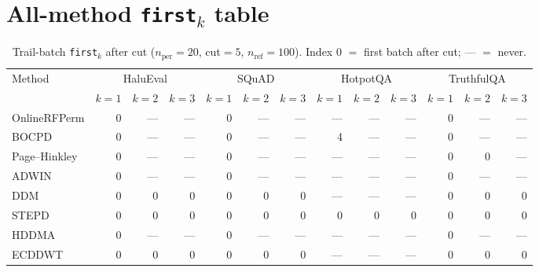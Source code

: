 \documentclass[11pt]{article}
\begin{document}
\section{All-method \texttt{first}$_k$ table}
\begin{table}[h]
\centering
\small
\caption{Trail-batch \texttt{first}$_k$ after cut
($n_{\mathrm{per}}=20$, cut$=5$, $n_{\mathrm{ref}}=100$).
Index $0$ $=$ first batch after cut; --- $=$ never.}
\begin{tabular}{lrrrrrrrrrrrr}
\toprule
Method & \multicolumn{3}{c}{HaluEval} & \multicolumn{3}{c}{SQuAD}
 & \multicolumn{3}{c}{HotpotQA} & \multicolumn{3}{c}{TruthfulQA} \\
\cmidrule(lr){2-4} \cmidrule(lr){5-7} \cmidrule(lr){8-10} \cmidrule(lr){11-13}
 & $k{=}1$ & $k{=}2$ & $k{=}3$ & $k{=}1$ & $k{=}2$ & $k{=}3$
 & $k{=}1$ & $k{=}2$ & $k{=}3$ & $k{=}1$ & $k{=}2$ & $k{=}3$ \\
\midrule
OnlineRFPerm & 0 & --- & --- & 0 & --- & --- & --- & --- & --- & 0 & --- & --- \\
BOCPD        & 0 & --- & --- & 0 & --- & --- & 4   & --- & --- & 0 & --- & --- \\
Page--Hinkley& 0 & --- & --- & 0 & --- & --- & --- & --- & --- & 0 & 0   & --- \\
ADWIN        & 0 & --- & --- & 0 & --- & --- & --- & --- & --- & 0 & --- & --- \\
DDM          & 0 & 0   & 0   & 0 & 0   & 0   & --- & --- & --- & 0 & 0   & 0   \\
STEPD        & 0 & 0   & 0   & 0 & 0   & 0   & 0   & 0   & 0   & 0 & 0   & 0   \\
HDDMA        & 0 & --- & --- & 0 & --- & --- & --- & --- & --- & 0 & --- & --- \\
ECDDWT       & 0 & 0   & 0   & 0 & 0   & 0   & --- & --- & --- & 0 & 0   & 0   \\
\bottomrule
\end{tabular}
\end{table}
\end{document}
